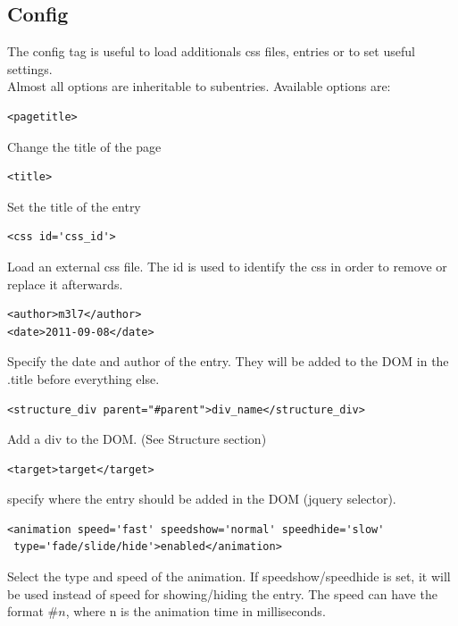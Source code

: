 \documentclass[a4paper,12pt]{article}
\begin{document}
\subsection{Config}
The config tag is useful to load additionals css files, entries or to set useful settings.\\
Almost all options are inheritable to subentries. Available options are:
\begin{list}{-}{}
\item \begin{verbatim}
<pagetitle>       
      \end{verbatim}
Change the title of the page
\item \begin{verbatim}
<title>       
      \end{verbatim}
Set the title of the entry
\item \begin{verbatim}
<css id='css_id'>       
      \end{verbatim}
Load an external css file. The id is used to identify the css in order to remove or replace it afterwards.
\item \begin{verbatim}
<author>m3l7</author>
<date>2011-09-08</date>
      \end{verbatim}
Specify the date and author of the entry. They will be added to the DOM in the .title before everything else.
\item \begin{verbatim}
<structure_div parent="#parent">div_name</structure_div>       
      \end{verbatim}
Add a div to the DOM. (See Structure section)
\item \begin{verbatim}
<target>target</target>       
      \end{verbatim}
specify where the entry should be added in the DOM (jquery selector).
\item \begin{verbatim}
<animation speed='fast' speedshow='normal' speedhide='slow'
 type='fade/slide/hide'>enabled</animation>
      \end{verbatim}
Select the type and speed of the animation. If speedshow/speedhide is set, it will be used instead of speed for showing/hiding the entry.
The speed can have the format $\#n$, where n is the animation time in milliseconds.
\item \begin{verbatim}

\end{verbatim}
\end{list}
\end{document}

